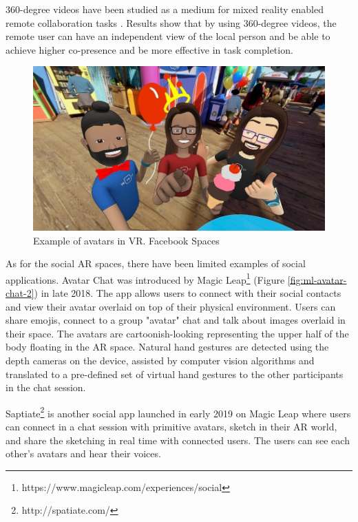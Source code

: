 360-degree videos have been studied as a medium for mixed reality enabled remote collaboration tasks \cite{Tang2017a, Lee2017, lee2017mixed, Lee2019}. Results show that by using 360-degree videos, the remote user can have an independent view of the local person and be able to achieve higher co-presence and be more effective in task completion. 

\begin{figure}
    \centering
    \includegraphics[width=0.8\linewidth]{images/facebook-spaces.jpg}
    \caption{Example of avatars in VR. Facebook Spaces}
    \label{fig:facebook-spaces}
\end{figure}

As for the social AR spaces, there have been limited examples of social applications. Avatar Chat was introduced by Magic Leap\footnote{https://www.magicleap.com/experiences/social} (Figure \ref{fig:ml-avatar-chat-2}) in late 2018. The app allows users to connect with their social contacts and view their avatar overlaid on top of their physical environment. Users can share emojis, connect to a group "avatar" chat and talk about images overlaid in their space. The avatars are cartoonish-looking representing the upper half of the body floating in the AR space. Natural hand gestures are detected using the depth cameras on the device, assisted by computer vision algorithms and translated to a pre-defined set of virtual hand gestures to the other participants in the chat session. 

Saptiate\footnote{http://spatiate.com/} is another social app launched in early 2019 on Magic Leap where users can connect in a chat session with primitive avatars, sketch in their AR world, and share the sketching in real time with connected users. The users can see each other's avatars and hear their voices. 

